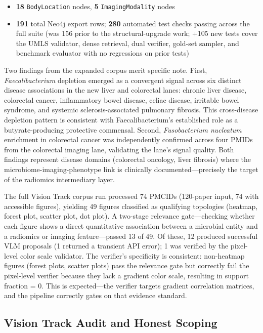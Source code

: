 \documentclass[12pt, letterpaper]{article}
\begin{document}
\begin{itemize}
    \item \textbf{18} \texttt{BodyLocation} nodes, \textbf{5} \texttt{ImagingModality} nodes
    \item \textbf{191} total Neo4j export rows; \textbf{280} automated test checks passing across the full suite (was 156 prior to the structural-upgrade work; +105 new tests cover the UMLS validator, dense retrieval, dual verifier, gold-set sampler, and benchmark evaluator with no regressions on prior tests)
\end{itemize}

Two findings from the expanded corpus merit specific note. First, \textit{Faecalibacterium} depletion emerged as a convergent signal across six distinct disease associations in the new liver and colorectal lanes: chronic liver disease, colorectal cancer, inflammatory bowel disease, celiac disease, irritable bowel syndrome, and systemic sclerosis-associated pulmonary fibrosis. This cross-disease depletion pattern is consistent with Faecalibacterium's established role as a butyrate-producing protective commensal. Second, \textit{Fusobacterium nucleatum} enrichment in colorectal cancer was independently confirmed across four PMIDs from the colorectal imaging lane, validating the lane's signal quality. Both findings represent disease domains (colorectal oncology, liver fibrosis) where the microbiome-imaging-phenotype link is clinically documented---precisely the target of the radiomics intermediary layer.

The full Vision Track corpus run processed 74 PMCIDs (120-paper input, 74 with accessible figures), yielding 49 figures classified as qualifying topologies (heatmap, forest plot, scatter plot, dot plot). A two-stage relevance gate—checking whether each figure shows a direct quantitative association between a microbial entity and a radiomics or imaging feature—passed 13 of 49. Of these, 12 produced successful VLM proposals (1 returned a transient API error); 1 was verified by the pixel-level color scale validator. The verifier's specificity is consistent: non-heatmap figures (forest plots, scatter plots) pass the relevance gate but correctly fail the pixel-level verifier because they lack a gradient color scale, resulting in support fraction = 0. This is expected—the verifier targets gradient correlation matrices, and the pipeline correctly gates on that evidence standard.

\subsection{Vision Track Audit and Honest Scoping}
\end{document}

